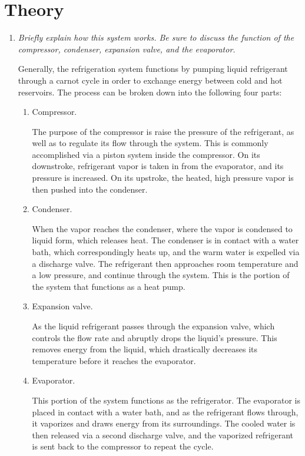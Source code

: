 \documentclass[twocolumn,english]{IEEEtran}
\theoremstyle{plain}
\theoremstyle{plain}
\begin{document}
\section{Theory}
\begin{enumerate}
	\item \textit{Briefly explain how this system works. Be sure to discuss the function of the compressor, condenser, expansion valve, and the evaporator.}

	Generally, the refrigeration system functions by pumping liquid refrigerant through a carnot cycle in order to exchange energy between cold and hot reservoirs. The process can be broken down into the following four parts:
	\begin{enumerate}
		\item Compressor.

		The purpose of the compressor is raise the pressure of the refrigerant, as well as to regulate its flow through the system. This is commonly accomplished via a piston system inside the compressor. On its downstroke, refrigerant vapor is taken in from the evaporator, and its pressure is increased. On its upstroke, the heated, high pressure vapor is then pushed into the condenser.

		\item Condenser.

		When the vapor reaches the condenser, where the vapor is condensed to liquid form, which releases heat. The condenser is in contact with a water bath, which correspondingly heats up, and the warm water is expelled via a discharge valve. The refrigerant then approaches room temperature and a low pressure, and continue through the system. This is the portion of the system that functions as a heat pump.

		\item Expansion valve.

		As the liquid refrigerant passes through the expansion valve, which controls the flow rate and abruptly drops the liquid's pressure. This removes energy from the liquid, which drastically decreases its temperature before it reaches the evaporator.

		\item Evaporator.

		This portion of the system functions as the refrigerator. The evaporator is placed in contact with a water bath, and as the refrigerant flows through, it vaporizes and draws energy from its surroundings. The cooled water is then released via a second discharge valve, and the vaporized refrigerant is sent back to the compressor to repeat the cycle.
	\end{enumerate}



\end{enumerate}
\end{document}
